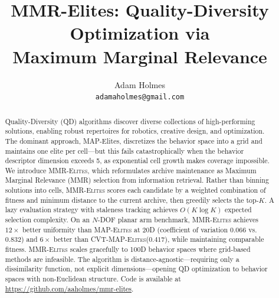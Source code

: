 \documentclass{article}
\title{MMR-Elites: Quality-Diversity Optimization via\\Maximum Marginal Relevance}
\author{
  Adam Holmes \\
  \texttt{adamaholmes@gmail.com}
}
\date{}
\newcommand{\mmr}{\textsc{MMR-Elites}\xspace}
\newcommand{\map}{\textsc{MAP-Elites}\xspace}
\newcommand{\cvt}{\textsc{CVT-MAP-Elites}\xspace}
\begin{document}
\maketitle

\begin{abstract}
Quality-Diversity (QD) algorithms discover diverse collections of high-performing solutions, enabling robust repertoires for robotics, creative design, and optimization.
The dominant approach, MAP-Elites, discretizes the behavior space into a grid and maintains one elite per cell---but this fails catastrophically when the behavior descriptor dimension exceeds 5, as exponential cell growth makes coverage impossible.
We introduce \mmr, which reformulates archive maintenance as Maximum Marginal Relevance (MMR) selection from information retrieval.
Rather than binning solutions into cells, \mmr scores each candidate by a weighted combination of fitness and minimum distance to the current archive, then greedily selects the top-$K$.
A lazy evaluation strategy with staleness tracking achieves $O(K \log K)$ expected selection complexity.
On an $N$-DOF planar arm benchmark, \mmr achieves $12\times$ better uniformity than \map at 20D (coefficient of variation $0.066$ vs.\ $0.832$) and $6\times$ better than \cvt ($0.417$), while maintaining comparable fitness.
\mmr scales gracefully to 100D behavior spaces where grid-based methods are infeasible.
The algorithm is distance-agnostic---requiring only a dissimilarity function, not explicit dimensions---opening QD optimization to behavior spaces with non-Euclidean structure.
Code is available at \url{https://github.com/aaholmes/mmr-elites}.
\end{abstract}










\end{document}
